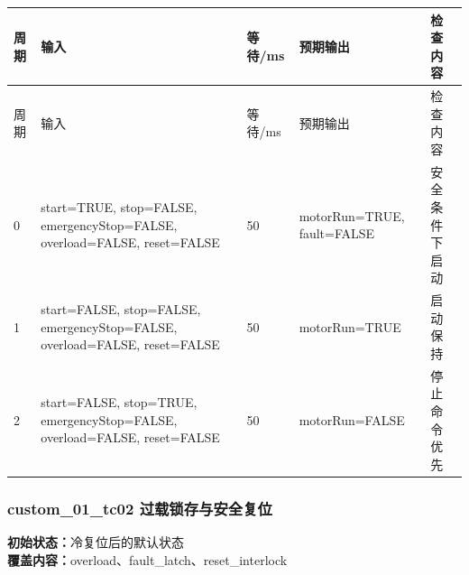 \begin{longtable}{L{1.0cm}L{4.7cm}L{1.4cm}L{4.0cm}L{2.1cm}}

\toprule

周期 & 输入 & 等待/ms & 预期输出 & 检查内容\\

\midrule

\endfirsthead

\toprule

周期 & 输入 & 等待/ms & 预期输出 & 检查内容\\

\midrule

\endhead

0 & start=TRUE, stop=FALSE, emergencyStop=FALSE, overload=FALSE, reset=FALSE & 50 & motorRun=TRUE, fault=FALSE & 安全条件下启动\\

1 & start=FALSE, stop=FALSE, emergencyStop=FALSE, overload=FALSE, reset=FALSE & 50 & motorRun=TRUE & 启动保持\\

2 & start=FALSE, stop=TRUE, emergencyStop=FALSE, overload=FALSE, reset=FALSE & 50 & motorRun=FALSE & 停止命令优先\\

\bottomrule

\end{longtable}

\subsubsection{{\ttfamily custom\_01\_tc02} 过载锁存与安全复位}

\noindent\textbf{初始状态：}冷复位后的默认状态\\

\textbf{覆盖内容：}overload、fault\_latch、reset\_interlock

